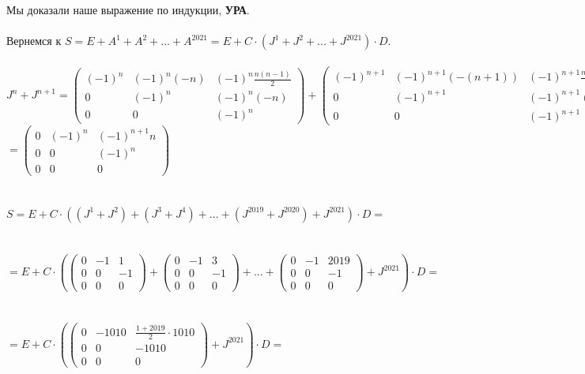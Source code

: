 \documentclass[a4paper, 12pt]{article}
\begin{document}
    \\
    \\ Мы доказали наше выражение по индукции, \textbf{УРА}.
    \\
    \\ Вернемся к $S = E + A^1 + A^2 + ... + A^{2021} = E + C \cdot (J^1 + J^2 + ... + J^{2021}) \cdot D$.
    \\
    \\ $J^n + J^{n + 1} = \begin{pmatrix}(-1)^{n} & (-1)^{n}(-n) & (-1)^n\frac{n(n - 1)}{2}\\0 & (-1)^{n} & (-1)^{n}(-n)\\0 & 0 & (-1)^{n}\end{pmatrix} + \begin{pmatrix}(-1)^{n + 1} & (-1)^{n + 1}(-(n + 1)) & (-1)^{n + 1}\frac{n(n + 1)}{2} \\0 & (-1)^{n + 1}  & (-1)^{n + 1}(-(n + 1))  \\0 & 0 & (-1)^{n + 1}  \end{pmatrix} = $
    \\ $ = \begin{pmatrix}0 & (-1)^{n} & (-1)^{n + 1}n\\0 & 0 & (-1)^{n}\\0 & 0 & 0\end{pmatrix}$
    \\
    \\
    \\ $S = E + C \cdot ((J^1 + J^2) + (J^3 + J^4) + ... + (J^{2019} + J^{2020})  + J^{2021}) \cdot D = $
    \\
    \\
    \\ $ = E + C \cdot (\begin{pmatrix}0 & -1 & 1\\0 & 0 & -1\\0 & 0 & 0\end{pmatrix} + \begin{pmatrix}0 & -1 & 3\\0 & 0 & -1\\0 & 0 & 0\end{pmatrix} + ... + \begin{pmatrix}0 & -1 & 2019\\0 & 0 & -1\\0 & 0 & 0\end{pmatrix} + J^{2021}) \cdot D = $
    \\
    \\
    \\ $ = E + C \cdot (\begin{pmatrix}0 & -1010 & \frac{1 + 2019}{2} \cdot 1010\\0 & 0 & -1010\\0 & 0 & 0\end{pmatrix} + J^{2021}) \cdot D = $
\end{document}
